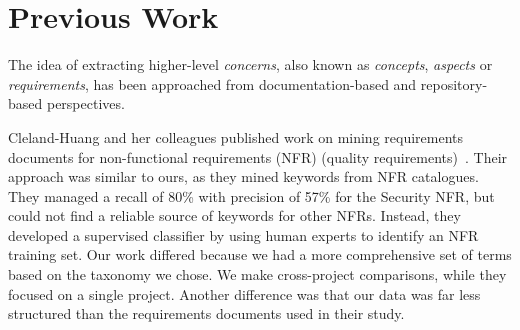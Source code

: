 \documentclass[]{sig-alternate}
\begin{document}



\section{Previous Work}
\label{sec:related}

The idea of extracting higher-level \emph{concerns}, also known as \emph{concepts}, \emph{aspects} or \emph{requirements}, has been approached from documentation-based and repository-based perspectives.

Cleland-Huang and her colleagues published work on mining requirements documents for non-functional requirements (NFR) (quality requirements)~\cite{Cleland-Huang2006}. 
Their approach was similar to ours, as they mined keywords from NFR catalogues.
They managed a recall of 80\% with precision of 57\% for the Security NFR, but could not find a reliable source of keywords for other NFRs. 
Instead, they developed a supervised classifier by using human experts to identify an NFR training set. 
Our work differed because we had a more comprehensive set of terms based on the taxonomy we chose.
We make cross-project comparisons, while they focused on a single project.
Another difference was that our data was far less structured than the requirements documents used in their study.
\end{document}
